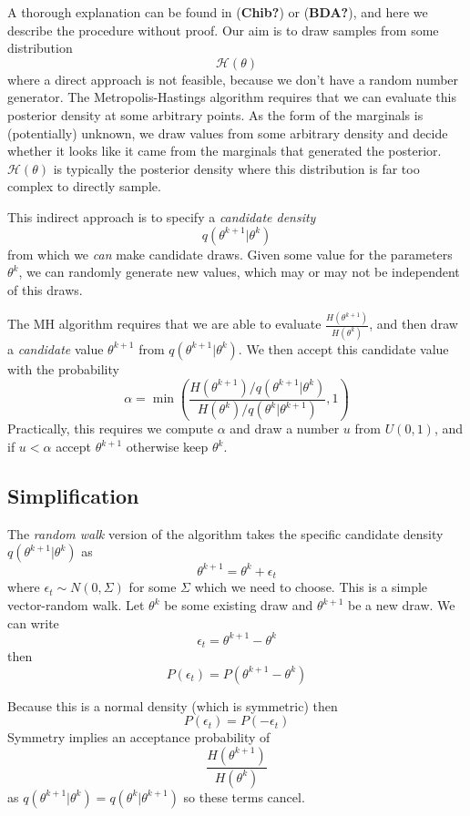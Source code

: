 \documentclass[
  letterpaper,
]{book}
\begin{document}
A thorough explanation can be found in (\textbf{Chib?}) or
(\textbf{BDA?}), and here we describe the procedure without proof. Our
aim is to draw samples from some distribution \[
 \mathcal{H}(\theta)
\] where a direct approach is not feasible, because we don't have a
random number generator. The Metropolis-Hastings algorithm requires that
we can evaluate this posterior density at some arbitrary points. As the
form of the marginals is (potentially) unknown, we draw values from some
arbitrary density and decide whether it looks like it came from the
marginals that generated the posterior. \(\mathcal{H}(\theta)\) is
typically the posterior density where this distribution is far too
complex to directly sample.

This indirect approach is to specify a \emph{candidate density} \[
  q(\theta^{k+1}|\theta^k)
\] from which we \emph{can} make candidate draws. Given some value for
the parameters \(\theta^k\), we can randomly generate new values, which
may or may not be independent of this draws.

The MH algorithm requires that we are able to evaluate
\(\frac{H(\theta^{k+1})}{H(\theta^k)}\), and then draw a
\emph{candidate} value \(\theta^{k+1}\) from
\(q(\theta^{k+1}|\theta^k)\). We then accept this candidate value with
the probability \[
  \alpha = \min \left(\frac{H(\theta^{k+1})/q(\theta^{k+1}|\theta^k)}{H(\theta^k)/q(\theta^k|\theta^{k+1})}, 1\right)
\] Practically, this requires we compute \(\alpha\) and draw a number
\(u\) from \(U(0,1)\), and if \(u<\alpha\) accept \(\theta^{k+1}\)
otherwise keep \(\theta^k\).

\hypertarget{simplification}{%
\subsection{Simplification}\label{simplification}}

The \emph{random walk} version of the algorithm takes the specific
candidate density \(q(\theta^{k+1}|\theta^k)\) as\\
\[
 \theta^{k+1} = \theta^k + \epsilon_t
\] where \(\epsilon_t\sim N(0,\Sigma)\) for some \(\Sigma\) which we
need to choose. This is a simple vector-random walk. Let \(\theta^k\) be
some existing draw and \(\theta^{k+1}\) be a new draw. We can write \[
  \epsilon_t = \theta^{k+1}-\theta^k
\] then \[
  P(\epsilon_t) = P(\theta^{k+1}-\theta^k)
\]

Because this is a normal density (which is symmetric) then\\
\[
  P(\epsilon_t) = P(-\epsilon_t)
\] Symmetry implies an acceptance probability of\\
\[
  \frac{H(\theta^{k+1})}{H(\theta^k)}
\] as \(q(\theta^{k+1}|\theta^k) = q(\theta^k|\theta^{k+1})\) so these
terms cancel.
\end{document}
